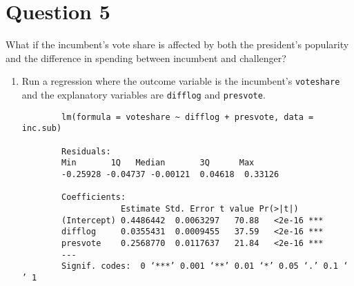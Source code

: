 \documentclass[12pt,letterpaper]{article}
\begin{document}
	\newpage	

\section*{Question 5}
\noindent What if the incumbent's vote share is affected by both the president's popularity and the difference in spending between incumbent and challenger? 
	\begin{enumerate}
		\item Run a regression where the outcome variable is the incumbent's \texttt{voteshare} and the explanatory variables are \texttt{difflog} and \texttt{presvote}.
		
		\begin{verbatim}
		lm(formula = voteshare ~ difflog + presvote, data = inc.sub)
		
		Residuals:
		Min       1Q   Median       3Q      Max 
		-0.25928 -0.04737 -0.00121  0.04618  0.33126 
		
		Coefficients:
	            	Estimate Std. Error t value Pr(>|t|)    
		(Intercept) 0.4486442  0.0063297   70.88   <2e-16 ***
		difflog     0.0355431  0.0009455   37.59   <2e-16 ***
		presvote    0.2568770  0.0117637   21.84   <2e-16 ***
		---
		Signif. codes:  0 ‘***’ 0.001 ‘**’ 0.01 ‘*’ 0.05 ‘.’ 0.1 ‘ ’ 1
		

\end{verbatim}
\end{enumerate}
\end{document}
